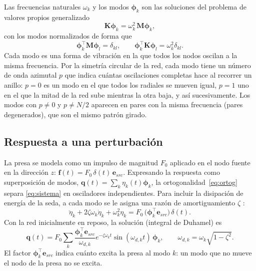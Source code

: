 \documentclass[11pt,letterpaper]{article}
\begin{document}
Las frecuencias naturales $\omega_k$ y los modos $\boldsymbol{\phi}_k$ son
las soluciones del problema de valores propios generalizado
\begin{equation}\label{eq:evp}
    \mathbf{K}\boldsymbol{\phi}_k=\omega_k^2\,\mathbf{M}\boldsymbol{\phi}_k ,
\end{equation}
con los modos normalizados de forma que
\begin{equation}\label{eq:ortog}
    \boldsymbol{\phi}_k^\top\mathbf{M}\boldsymbol{\phi}_l=\delta_{kl},\qquad
    \boldsymbol{\phi}_k^\top\mathbf{K}\boldsymbol{\phi}_l=\omega_k^2\delta_{kl}.
\end{equation}
Cada modo es una forma de vibración en la que todos los nodos oscilan a la
misma frecuencia. Por la simetría circular de la red, cada modo tiene un
número de onda azimutal $p$ que indica cuántas oscilaciones completas hace al
recorrer un anillo: $p=0$ es un modo en el que todos los radiales se mueven
igual, $p=1$ uno en el que la mitad de la red sube mientras la otra baja, y
así sucesivamente. Los modos con $p\neq0$ y $p\neq N/2$ aparecen en pares
con la misma frecuencia (pares degenerados), que son el mismo patrón girado.

\subsection{Respuesta a una perturbación}

La presa se modela como un impulso de magnitud $F_0$ aplicado en el nodo
fuente en la dirección $z$: $\mathbf{f}(t)=F_0\,\delta(t)\,\mathbf{e}_{src}$.
Expresando la respuesta como superposición de modos,
$\mathbf{q}(t)=\sum_k\eta_k(t)\boldsymbol{\phi}_k$, la
ortogonalidad~\eqref{eq:ortog} separa \eqref{eq:sistema} en osciladores
independientes. Para incluir la disipación de energía de la seda, a cada
modo se le asigna una razón de amortiguamiento $\zeta$ \cite{inman2014}:
\begin{equation}
    \ddot\eta_k+2\zeta\omega_k\dot\eta_k+\omega_k^2\eta_k
    =F_0\,\bigl(\boldsymbol{\phi}_k^\top\mathbf{e}_{src}\bigr)\,\delta(t).
\end{equation}
Con la red inicialmente en reposo, la solución (integral de Duhamel) es
\begin{equation}\label{eq:imp_amort}
    \mathbf{q}(t)=F_0\sum_k
    \frac{\boldsymbol{\phi}_k^\top\mathbf{e}_{src}}{\omega_{d,k}}
    e^{-\zeta\omega_k t}\sin(\omega_{d,k}t)\,\boldsymbol{\phi}_k,
    \qquad \omega_{d,k}=\omega_k\sqrt{1-\zeta^2}.
\end{equation}
El factor $\boldsymbol{\phi}_k^\top\mathbf{e}_{src}$ indica cuánto excita la
presa al modo $k$: un modo que no mueve el nodo de la presa no se excita.
\end{document}
